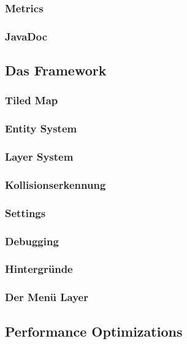 		\subsubsection{Metrics}						\clearpage
		\subsubsection{JavaDoc}						\clearpage
	\subsection{Das Framework}
		\subsubsection{Tiled Map}					\clearpage
		\subsubsection{Entity System}				\clearpage
		\subsubsection{Layer System}				\clearpage
		\subsubsection{Kollisionserkennung}			\clearpage
		\subsubsection{Settings}					\clearpage
		\subsubsection{Debugging}					\clearpage
		\subsubsection{Hintergründe}				\clearpage
		\subsubsection{Der Menü Layer}				\clearpage
	\subsection{Performance Optimizations}			\clearpage
